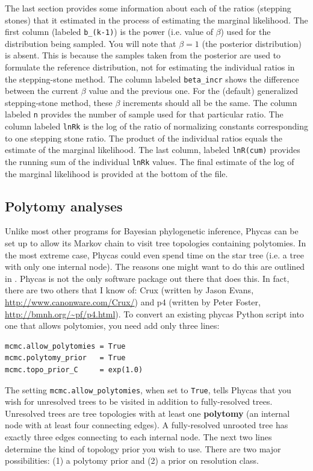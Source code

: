 \documentclass[10pt]{article}
\newcommand{\code}[1]{{\tt #1}}					%
\newcommand{\opt}[2]{{\tt \small #1.#2}\index{#1!#2}}	%
\newcommand{\term}[1]{{\bfseries #1}\index{#1}}	%
\begin{document}
The last section provides some information about each of the ratios (stepping stones) that it estimated in the process of estimating the marginal likelihood. The first column (labeled \code{b\_(k-1)}) is the power (i.e. value of $\beta$) used for the distribution being sampled. You will note that $\beta=1$ (the posterior distribution) is absent. This is because the samples taken from the posterior are used to formulate the reference distribution, not for estimating the individual ratios in the stepping-stone method. The column labeled \code{beta\_incr} shows the difference between the current $\beta$ value and the previous one. For the (default) generalized stepping-stone method, these $\beta$ increments should all be the same. The column labeled \code{n} provides the number of sample used for that particular ratio. The column labeled \code{lnRk} is the log of the ratio of normalizing constants corresponding to one stepping stone ratio. The product of the individual ratios equals the estimate of the marginal likelihood. The last column, labeled \code{lnR(cum)} provides the running sum of the individual \code{lnRk} values. The final estimate of the log of the marginal likelihood is provided at the bottom of the file.

\subsection{Polytomy analyses}\label{subsec:polytomyanalyses}

Unlike most other programs for Bayesian phylogenetic inference, Phycas can be set up to allow its Markov chain to visit tree topologies containing polytomies. In the most extreme case, Phycas could even spend time on the star tree (i.e. a tree with only one internal node). The reasons one might want to do this are outlined in \citet*{LewisHolderHolsinger2005}. Phycas is not the only software package out there that does this. In fact, there are two others that I know of: Crux (written by Jason Evans, \url{http://www.canonware.com/Crux/}) and p4 (written by Peter Foster, \url{http://bmnh.org/~pf/p4.html}).
To convert an existing phycas Python script into one that allows polytomies, you need add only three lines:
\begin{verbatim}
mcmc.allow_polytomies = True
mcmc.polytomy_prior   = True
mcmc.topo_prior_C     = exp(1.0)
\end{verbatim}
The setting \opt{mcmc}{allow\_polytomies}, when set to \code{True}, tells Phycas that you wish for unresolved trees to be visited in addition to fully-resolved trees. Unresolved trees are tree topologies with at least one \term{polytomy} (an internal node with at least four connecting edges). A fully-resolved unrooted tree has exactly three edges connecting to each internal node. The next two lines determine the kind of topology prior you wish to use. There are two major possibilities: (1) a polytomy prior and (2) a prior on resolution class.
\end{document}

